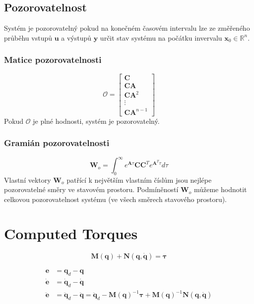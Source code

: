 \documentclass{article}
\begin{document}
	\subsection*{Pozorovatelnost}
	Systém je pozorovatelný pokud na konečném časovém intervalu lze ze změřeného průběhu vstupů $\bm{u}$ a výstupů $\bm{y}$ určit stav systému na počátku invervalu $\bm{x}_0 \in \mathbb{R}^n$.
	
	\subsubsection*{Matice pozorovatelnosti}
	\begin{equation}
		\bm{\mathcal{O}}
		=
		\begin{bmatrix}
			\bm{C} \\
			\bm{C} \bm{A} \\
			\bm{C} \bm{A}^{2} \\
			\vdots \\
			\bm{C} \bm{A}^{n-1}
		\end{bmatrix}
	\end{equation}
	Pokud $\bm{\mathcal{O}}$ je plné hodnosti, systém je pozorovatelný.

	\subsubsection*{Gramián pozorovatelnosti}
	\begin{equation}
		\bm{W}_{o}
		=
		\int_{0}^{\infty} e^{\bm{A} \tau} \bm{C} \bm{C}^T e^{\bm{A}^T \tau} d \tau
	\end{equation}
	Vlastní vektory $\bm{W}_o$ patřící k největším vlastním číslům jsou nejlépe pozorovatelné směry ve stavovém prostoru. Podmíněností $\bm{W}_o$ můžeme hodnotit celkovou pozorovatelnost systému (ve všech směrech stavového prostoru).

	\section{Computed Torques}
	\begin{equation}
	\bm{M}(\bm{q}) + \bm{N}(\bm{q},\bm{\dot{q}}) = \bm{\tau}
	\end{equation}

	\begin{align}
		\bm{e} &= \bm{q}_{d}-\bm{q} \\
		\bm{\dot{e}} &= \bm{\dot{q}}_{d}-\bm{\dot{q}} \\
		\bm{\ddot{e}}
		&=
		\bm{\ddot{q}}_{d}-\bm{\ddot{q}}
		=
		\bm{\ddot{q}}_{d}-\bm{M}(\bm{q})^{-1} \bm{\tau}+\bm{M}(\bm{q})^{-1} \bm{N}(\bm{q},\bm{\dot{q}})
	\end{align}
\end{document}
